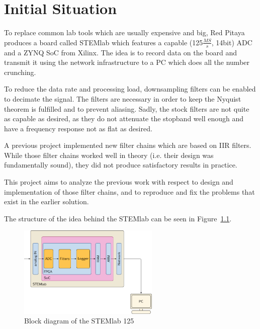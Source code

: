 \documentclass[a4paper,oneside]{alpenspecs/alpenspecs}
\begin{document}
\frontmatter %
\tableofcontents*

\mainmatter

\chapter{Initial Situation} %
\label{ch:initial}

To replace  common lab tools which  are usually expensive and  big, Red Pitaya
produces a board  called STEMlab which features  a capable (125$\frac{MS}{s}$,
14bit) ADC and a ZYNQ SoC from Xilinx. The idea is to record data on the board
and transmit it  using the network infrastructure  to a PC which  does all the
number crunching.

To  reduce the  data rate  and processing  load, downsampling  filters can  be
enabled to decimate the signal. The filters are necessary in order to keep the
Nyquist theorem is fulfilled and to prevent aliasing. Sadly, the stock filters
are not  quite as capable  as desired, as they  do not attenuate  the stopband
well enough and have a frequency response not as flat as desired.

A  previous project  implemented  new filter  chains which  are  based on  IIR
filters. While those  filter chains worked  well in theory (i.e.  their design
was  fundamentally  sound),  they  did not  produce  satisfactory  results  in
practice.

This project  aims to  analyze the  previous work with  respect to  design and
implementation of those  filter chains, and to reproduce and  fix the problems
that exist in the earlier solution.

The   structure  of   the   idea   behind  the   STEMlab   can   be  seen   in
Figure~\ref{fig:system}.

\begin{figure}[h]
    \centering
    \includegraphics[width=0.60\textwidth]{images/system-overview.pdf}
    \caption{Block diagram of the STEMlab 125}
    \label{fig:system}
\end{figure}
\end{document}
